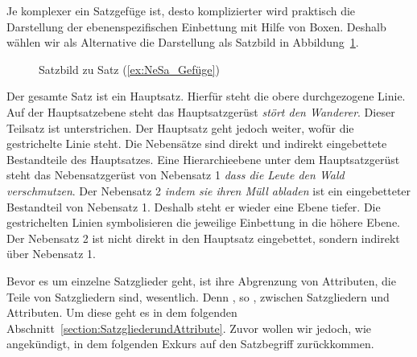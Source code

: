 Je komplexer ein Satzgefüge ist, desto komplizierter wird praktisch die Darstellung der ebenenspezifischen Einbettung mit Hilfe von Boxen. Deshalb wählen wir als Alternative die Darstellung als Satzbild in Abbildung~\ref{Abb:Satzbild}.

\begin{figure}
    \centering
    
    \caption{Satzbild zu Satz (\ref{ex:NeSa_Gefüge})}
    \label{Abb:Satzbild}
\end{figure}
 
Der gesamte Satz ist ein Hauptsatz. Hierfür steht die obere durchgezogene Linie. Auf der Hauptsatzebene steht das Hauptsatzgerüst \textit{stört den Wanderer}. Dieser Teilsatz ist unterstrichen. Der Hauptsatz geht jedoch weiter, wofür die gestrichelte Linie steht. Die Nebensätze sind direkt und indirekt eingebettete Bestandteile des Hauptsatzes. Eine Hierarchieebene unter dem Hauptsatzgerüst steht das Nebensatzgerüst von Nebensatz 1 \textit{dass die Leute den Wald verschmutzen}. Der Nebensatz 2 \textit{indem sie ihren Müll abladen} ist ein eingebetteter Bestandteil von Nebensatz 1. Deshalb steht er wieder eine Ebene tiefer. Die gestrichelten Linien symbolisieren die jeweilige Einbettung in die höhere Ebene. Der Nebensatz 2 ist nicht direkt in den Hauptsatz eingebettet, sondern indirekt über Nebensatz 1.    

Bevor es um einzelne Satzglieder geht, ist ihre Abgrenzung von Attributen, die Teile von Satzgliedern sind, wesentlich. Denn , so \citet[80]{Welke2007},  zwischen Satzgliedern und Attributen. Um diese geht es in dem folgenden Abschnitt~\ref{section:SatzgliederundAttribute}. Zuvor wollen wir jedoch, wie angekündigt, in dem folgenden Exkurs auf den Satzbegriff zurückkommen.

